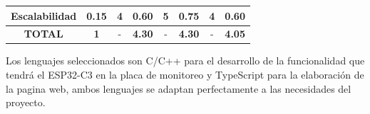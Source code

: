 \begin{tabla}[leng]
{\begin{tabular}{|c|c|c|c|c|c|c|c|}
\hline
Escalabilidad                                                                                             & 0.15                                                                       & 4               & 0.60                 & 5               & 0.75                   & 4               & 0.60                  \\ 
\hline
\textbf{TOTAL}                                                                                            & \textbf{1}                                                                 & -               & \textbf{4.30}        & -               & \textbf{4.30}          & -               & \textbf{4.05}         \\
\hline
\end{tabular}
}
\end{tabla}

Los lenguajes seleccionados son C/C++ para el desarrollo de la funcionalidad que tendrá el ESP32-C3 en la placa de monitoreo y TypeScript para la elaboración de la pagina web, ambos lenguajes se adaptan perfectamente a las necesidades del proyecto.

